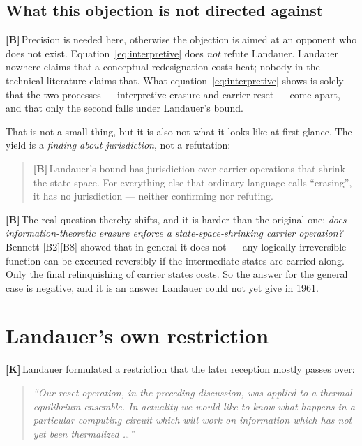 \documentclass[11pt,a4paper]{article}
\newcommand{\LK}{\textcolor{layK}{\textbf{\footnotesize\textsf{[K]}}}\,}
\newcommand{\LB}{\textcolor{layB}{\textbf{\footnotesize\textsf{[B]}}}\,}
\theoremstyle{ffgft}
\begin{document}
\subsection{What this objection is not directed against}

\LB Precision is needed here, otherwise the objection is aimed at an opponent who
does not exist. Equation~\eqref{eq:interpretive} does \emph{not} refute Landauer.
Landauer nowhere claims that a conceptual redesignation costs heat; nobody in the
technical literature claims that. What
equation~\eqref{eq:interpretive} shows is solely that the two processes ---
interpretive erasure and carrier reset --- come apart, and that only the second
falls under Landauer's bound.

That is not a small thing, but it is also not what it looks like at first glance.
The yield is a \emph{finding about jurisdiction}, not a refutation:

\begin{quote}
\LB Landauer's bound has jurisdiction over carrier operations that shrink the
state space. For everything else that ordinary language calls “erasing”, it has no
jurisdiction --- neither confirming nor refuting.
\end{quote}

\LB The real question thereby shifts, and it is harder than the original one:
\emph{does information-theoretic erasure enforce a state-space-shrinking carrier
operation?} Bennett [B2][B8] showed that in general it does not --- any logically
irreversible function can be executed reversibly if the intermediate states are
carried along. Only the final relinquishing of carrier states costs. So the answer
for the general case is negative, and it is an answer Landauer could not yet give
in 1961.

\section{Landauer's own restriction}

\LK Landauer formulated a restriction that the later reception mostly passes over:

\begin{quote}
\itshape
“Our reset operation, in the preceding discussion, was applied to a thermal
equilibrium ensemble. In actuality we would like to know what happens in a
particular computing circuit which will work on information which has not yet been
thermalized \ldots” \upshape [B1]
\end{quote}
\end{document}
